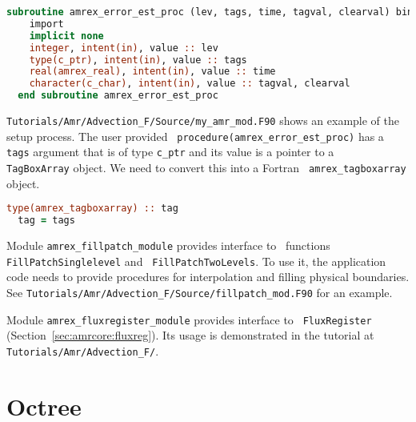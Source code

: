 {\begin{lstlisting}[language=fortran]
  subroutine amrex_error_est_proc (lev, tags, time, tagval, clearval) bind(c)
    import
    implicit none
    integer, intent(in), value :: lev
    type(c_ptr), intent(in), value :: tags
    real(amrex_real), intent(in), value :: time
    character(c_char), intent(in), value :: tagval, clearval
  end subroutine amrex_error_est_proc
\end{lstlisting}
{\tt Tutorials/Amr/Advection\_F/Source/my\_amr\_mod.F90} shows an
example of the setup process.  The user provided {\tt
  procedure(amrex\_error\_est\_proc)} has a {\tt tags} argument that
is of type {\tt c\_ptr} and its value is a pointer to a \cpp\ {\tt
  TagBoxArray} object.  We need to convert this into a Fortran {\tt
  amrex\_tagboxarray} object.
\begin{lstlisting}[language=fortran]
  type(amrex_tagboxarray) :: tag
  tag = tags
\end{lstlisting}

Module {\tt amrex\_fillpatch\_module} provides interface to
\cpp\ functions {\tt FillPatchSinglelevel} and {\tt
  FillPatchTwoLevels}.   To use it, the application code needs to
provide procedures for interpolation and filling physical boundaries.
See {\tt Tutorials/Amr/Advection\_F/Source/fillpatch\_mod.F90} for an
example. 

Module {\tt amrex\_fluxregister\_module} provides interface to {\tt
  FluxRegister} (Section~\ref{sec:amrcore:fluxreg}).  Its usage is
demonstrated in the tutorial at {\tt
  Tutorials/Amr/Advection\_F/}. 

\section{Octree}
\label{sec:fi:octree}

}
